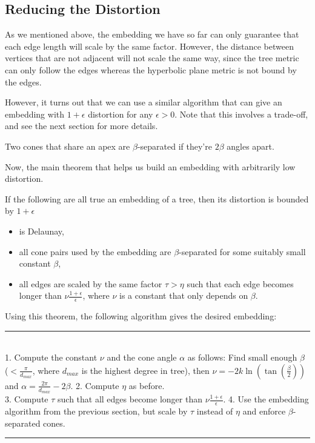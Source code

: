 \subsection{Reducing the Distortion}
As we mentioned above, the embedding we have so far can only guarantee that each edge length will scale by the same factor. However, the distance between vertices that are not adjacent will not scale the same way, since the tree metric can only follow the edges whereas the hyperbolic plane metric is not bound by the edges.

However, it turns out that we can use a similar algorithm that can give an embedding with $1 + \epsilon$ distortion for any $\epsilon > 0$. Note that this involves a trade-off, and see the next section for more details.

\begin{definition}
Two cones that share an apex are $\beta$-separated if they're $2\beta$ angles apart.
\end{definition}

Now, the main theorem that helps us build an embedding with arbitrarily low distortion.

\begin{theorem}
If the following are all true an embedding of a tree, then its distortion is bounded by $1 + \epsilon$
\begin{itemize}
    \item is Delaunay,
    \item all cone pairs used by the embedding are $\beta$-separated for some suitably small constant $\beta$,
    \item all edges are scaled by the same factor $\tau > \eta$ such that each edge becomes longer than $\nu\frac{1+\epsilon}{\epsilon}$, where $\nu$ is a constant that only depends on $\beta$.
\end{itemize}
\end{theorem}

Using this theorem, the following algorithm gives the desired embedding: \\
\rule{\linewidth}{0.5pt} \\
1. Compute the constant $\nu$ and the cone angle $\alpha$ as follows: Find small enough $\beta$ ($< \frac{\pi}{d_{max}}$, where $d_{max}$ is the highest degree in tree), then $\nu = -2k\ln(\tan(\frac{\beta}{2}))$ and $\alpha = \frac{2\pi}{d_{max}} - 2\beta$.
2. Compute $\eta$ as before. \\
3. Compute $\tau$ such that all edges become longer than $\nu\frac{1+\epsilon}{\epsilon}$.
4. Use the embedding algorithm from the previous section, but scale by  $\tau$ instead of $\eta$ and enforce $\beta$-separated cones.\\
\rule{\linewidth}{0.5pt} \\